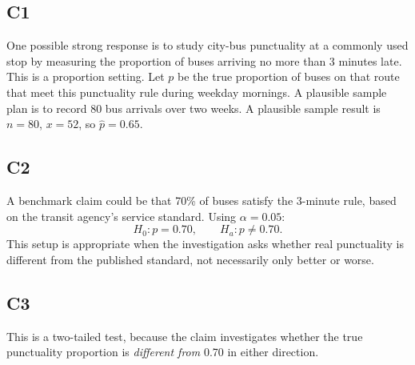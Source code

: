 	\subsection*{C1}
	One possible strong response is to study city-bus punctuality at a commonly used stop by measuring the proportion of buses arriving no more than 3 minutes late. This is a proportion setting. Let \(p\) be the true proportion of buses on that route that meet this punctuality rule during weekday mornings. A plausible sample plan is to record 80 bus arrivals over two weeks. A plausible sample result is \(n=80\), \(x=52\), so \(\hat p=0.65\).
	
	\subsection*{C2}
	A benchmark claim could be that 70\% of buses satisfy the 3-minute rule, based on the transit agency's service standard. Using \(\alpha=0.05\):
	\[
	H_0\colon p=0.70, \qquad H_a\colon p\neq 0.70.
	\]
	This setup is appropriate when the investigation asks whether real punctuality is different from the published standard, not necessarily only better or worse.
	
	\subsection*{C3}
	This is a two-tailed test, because the claim investigates whether the true punctuality proportion is \emph{different from} 0.70 in either direction.


